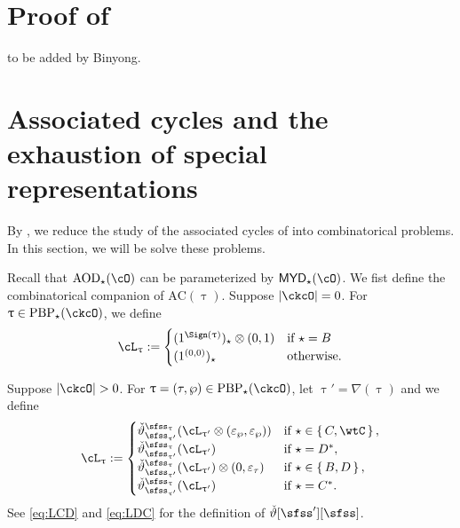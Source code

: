 \documentclass[12pt,a4paper]{amsart}
\newcommand{\AC}{\mathrm{AC}}
\def\MYD{{\mathsf{MYD}}}
\def\abs#1{\left|{#1}\right|}
\def\DD{\nabla}
\numberwithin{equation}{section}
\theoremstyle{remark}
\def\uptaup{\uptau^{\prime}}
\def\PBP{\mathrm{PBP}}
\begin{document}
\section{Proof of }
to be added by Binyong.

\section{Associated cycles and the exhaustion of special representations} \label{sec:ACC}

\def\dsign{{}^d\mathrm{Sign}}

\def\acm{\cL}
\def\acme{\tilde{\cL}}

By ,
 we reduce the study of the associated cycles of into 
 combinatorical problems.
In this section, we  will be solve these problems. 

Recall that $\AOD_{\star}(\cO)$ can be parameterized by $\MYD_{\star}(\cO)$. 
We fist define the combinatorical companion of $\AC(\uptau)$.
Suppose $\abs{\ckcO}=0$. For $\uptau\in \PBP_{\star}(\ckcO)$, we define
\[
  \ac_{\uptau} :=
  \begin{cases}
   (1^{\Sign(\uptau)})_{\star}\lotimes(0,1) & \text{if } \star=B\\
   (1^{(0,0)})_{\star} & \text{otherwise}.
  \end{cases}
\]

Suppose $\abs{\ckcO} >0$. For $\uptau = (\tau,\wp)\in \PBP_{\star}(\ckcO)$, let
$\uptau' = \DD(\uptau)$ and we define
\[
\ac_{\uptau} :=
\begin{cases}
  \dliftv[\sfss_{\uptau'}][\sfss_{\uptau}](\ac_{\uptaup}\lotimes (\varepsilon_{\wp},\varepsilon_{\wp}))
  & \text{if } \star\in \set{C,\wtC},\\
  \dliftv[\sfss_{\uptau'}][\sfss_{\uptau}](\ac_{\uptaup})
  & \text{if } \star = D^{*}, \\
  \dliftv[\sfss_{\uptau'}][\sfss_{\uptau}](\ac_{\uptaup})\lotimes (0,\varepsilon_{\tau})
  & \text{if } \star \in \set{B,D}, \\
  \dliftv[\sfss_{\uptau'}][\sfss_{\uptau}](\ac_{\uptaup})
  & \text{if } \star = C^{*}.
\end{cases}
\]
See  \eqref{eq:LCD} and \eqref{eq:LDC} for the definition of $\dlift[\sfss'][\sfss]$.
\end{document}
